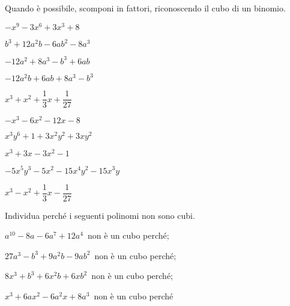\begin{esercizio}
\label{ese:16.20}
Quando è possibile, scomponi in fattori, riconoscendo il cubo di un binomio.
\begin{multicols}{2}
\begin{enumeratea}
 \item $-x^{9}-3x^{6}+3x^{3}+8$
 \item $b^{3}+12a^{2}b-6ab^{2}-8a^{3}$
 \item $-12a^{2}+8a^{3}-b^{3}+6ab$
 \item $-12a^{2}b+6ab+8a^{3}-b^{3}$
 \item $x^{3}+x^{2}+\dfrac{1}{3}x+\dfrac{1}{27}$
 \item $-x^{3}-6x^{2}-12x-8$
 \item $x^{3}y^{6}+1+3x^{2}y^{2}+3xy^{2}$
 \item $x^{3}+3x-3x^{2}-1$
 \item $-5x^{5}y^{3}-5x^{2}-15x^{4}y^{2}-15x^{3}y$
 \item $x^{3}-x^{2}+\dfrac{1}{3}x-\dfrac{1}{27}$
\end{enumeratea}
\end{multicols}
\end{esercizio}

\begin{esercizio}
\label{ese:16.24}
Individua perché i seguenti polinomi non sono cubi.
\begin{enumeratea}
 \item $a^{10}-8a-6a^{7}+12a^{4}$\, non è un cubo perché\dotfill;
 \item $27a^{3}-b^{3}+9a^{2}b-9ab^{2}$\, non è un cubo perché\dotfill;
 \item $8x^{3}+b^{3}+6x^{2}b+6{xb}^{2}$\, non è un cubo perché\dotfill;
 \item $x^{3}+6ax^{2}-6a^{2}x+8a^{3}$\, non è un cubo perché\dotfill
\end{enumeratea}
\end{esercizio}

